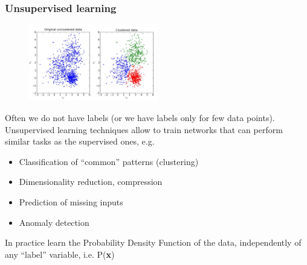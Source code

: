 \subsubsection{Unsupervised learning}

\begin{figure}
	\includegraphics[width=0.5\textwidth]{figure_ml/unsupervised.png}
\end{figure} 

Often we do not have labels (or we have labels only for few data points). Unsupervised learning techniques allow to train networks that can perform
similar tasks as the supervised ones, e.g.

\begin{itemize}
	\item Classification of “common” patterns (clustering)
	\item Dimensionality reduction, compression
	\item Prediction of missing inputs
	\item Anomaly detection
\end{itemize}



In practice learn the Probability Density Function of the data, independently of any “label” variable, i.e. P(\textbf{x})

